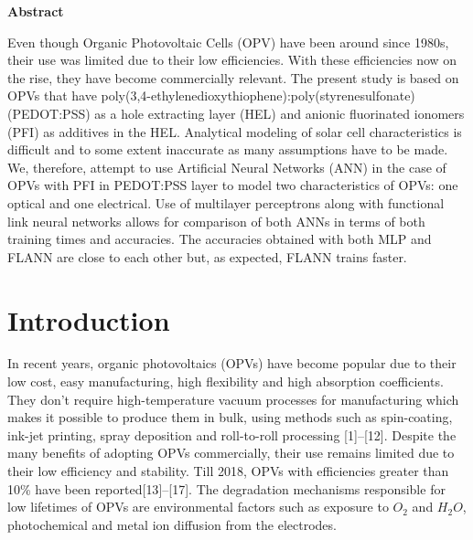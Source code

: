 \documentclass[]{article}
\begin{document}
\begin{center}
\Large{\textbf{Abstract}}\\
\end{center}
\normalsize{Even though Organic Photovoltaic Cells (OPV) have been around since 1980s, their use was limited due
to their low efficiencies. With these efficiencies now on the rise, they have become commercially relevant.
The present study is based on OPVs that have poly(3,4-ethylenedioxythiophene):poly(styrenesulfonate)
(PEDOT:PSS) as a hole extracting layer (HEL) and anionic fluorinated ionomers (PFI) as additives in
the HEL. Analytical modeling of solar cell characteristics is difficult and to some extent inaccurate as
many assumptions have to be made. We, therefore, attempt to use Artificial Neural Networks (ANN) in the
case of OPVs with PFI in PEDOT:PSS layer to model two characteristics of OPVs: one optical and one
electrical. Use of multilayer perceptrons along with functional link neural networks allows for comparison
of both ANNs in terms of both training times and accuracies. The accuracies obtained with both MLP
and FLANN are close to each other but, as expected, FLANN trains faster.}\\

\doublespacing

\newpage

\newpage

\hypertarget{introduction}{%
\section{Introduction}\label{introduction}}

In recent years, organic photovoltaics (OPVs) have become popular due to their low cost, easy manufacturing, high flexibility and high absorption coefficients. They don't require high-temperature vacuum processes for manufacturing which makes it possible to produce them in bulk, using methods such as spin-coating, ink-jet printing, spray deposition and roll-to-roll processing {[}1{]}--{[}12{]}. Despite the many benefits of adopting OPVs commercially, their use remains limited due to their low efficiency and stability. Till 2018, OPVs with efficiencies greater than 10\% have been reported{[}13{]}--{[}17{]}. The degradation mechanisms responsible for low lifetimes of OPVs are environmental factors such as exposure to \(O_2\) and \(H_2O\), photochemical and metal ion diffusion from the electrodes.
\end{document}
